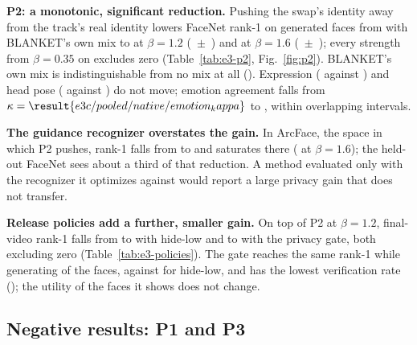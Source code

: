 \textbf{P2: a monotonic, significant reduction.} Pushing the swap's identity away
from the track's real identity lowers FaceNet rank-1 on generated faces from
 with BLANKET's own mix to
 at $\beta = 1.2$
(~$\pm$~)
and  at $\beta = 1.6$
(~$\pm$~);
every strength from $\beta = 0.35$ on excludes zero (Table~\ref{tab:e3-p2},
Fig.~\ref{fig:p2}). BLANKET's own mix is indistinguishable from no mix at all
(). Expression
( against )
and head pose (\textdegree{} against
\textdegree) do not move; emotion agreement
falls from $\kappa = \result{e3c/pooled/native/emotion_kappa}$ to
, within overlapping intervals.

\textbf{The guidance recognizer overstates the gain.} In ArcFace, the space in
which P2 pushes, rank-1 falls from  to
 and saturates there
( at $\beta = 1.6$); the held-out FaceNet
sees about a third of that reduction. A method evaluated only with the
recognizer it optimizes against would report a large privacy gain that does
not transfer.

\textbf{Release policies add a further, smaller gain.} On top of P2 at
$\beta = 1.2$, final-video rank-1 falls from 
to  with hide-low and to
 with the privacy gate, both excluding
zero (Table~\ref{tab:e3-policies}). The gate reaches the same rank-1 while
generating  of the faces, against
 for hide-low, and has the lowest
verification rate (); the
utility of the faces it shows does not change.

\subsection{Negative results: P1 and P3}

